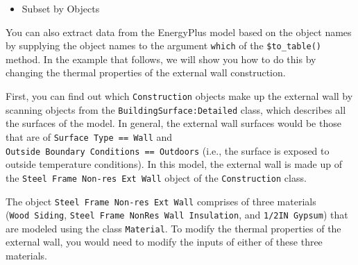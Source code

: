 \documentclass[
]{book}
\newenvironment{Shaded}{\begin{snugshade}}{\end{snugshade}}
\newcommand{\AttributeTok}[1]{\textcolor[rgb]{0.77,0.63,0.00}{#1}}
\newcommand{\ConstantTok}[1]{\textcolor[rgb]{0.00,0.00,0.00}{#1}}
\newcommand{\DocumentationTok}[1]{\textcolor[rgb]{0.56,0.35,0.01}{\textbf{\textit{#1}}}}
\newcommand{\FunctionTok}[1]{\textcolor[rgb]{0.00,0.00,0.00}{#1}}
\newcommand{\NormalTok}[1]{#1}
\newcommand{\OtherTok}[1]{\textcolor[rgb]{0.56,0.35,0.01}{#1}}
\newcommand{\SpecialCharTok}[1]{\textcolor[rgb]{0.00,0.00,0.00}{#1}}
\newcommand{\StringTok}[1]{\textcolor[rgb]{0.31,0.60,0.02}{#1}}
\providecommand{\tightlist}{%
  \setlength{\itemsep}{0pt}\setlength{\parskip}{0pt}}
\begin{document}
\begin{itemize}
\tightlist
\item
  Subset by Objects
\end{itemize}

You can also extract data from the EnergyPlus model based on the object names by supplying the object names to the argument \texttt{which} of the \texttt{\$to\_table()} method. In the example that follows, we will show you how to do this by changing the thermal properties of the external wall construction.

First, you can find out which \texttt{Construction} objects make up the external wall by scanning objects from the \texttt{BuildingSurface:Detailed} class, which describes all the surfaces of the model. In general, the external wall surfaces would be those that are of \texttt{Surface\ Type\ ==\ Wall} and \texttt{Outside\ Boundary\ Conditions\ ==\ Outdoors} (i.e., the surface is exposed to outside temperature conditions). In this model, the external wall is made up of the \texttt{Steel\ Frame\ Non-res\ Ext\ Wall} object of the \texttt{Construction} class.

\begin{Shaded}
\end{Shaded}

The object \texttt{Steel\ Frame\ Non-res\ Ext\ Wall} comprises of three materials (\texttt{Wood\ Siding}, \texttt{Steel\ Frame\ NonRes\ Wall\ Insulation}, and \texttt{1/2IN\ Gypsum}) that are modeled using the class \texttt{Material}. To modify the thermal properties of the external wall, you would need to modify the inputs of either of these three materials.
\end{document}
